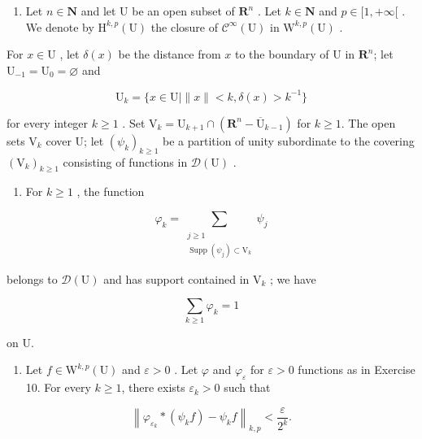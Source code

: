 \begin{enumerate}
\def\labelenumi{\arabic{enumi})}
\setcounter{enumi}{10}
\tightlist
\item
  Let \(n \in \mathbf{N}\) and let U be an open subset of \(\mathbf{R}^n\) . Let \(k \in \mathbf{N}\) and \(p \in [1, +\infty[\) . We denote by \(\mathrm{H}^{k,p}(\mathrm{U})\) the closure of \(\mathcal{C}^{\infty}(\mathrm{U})\) in \(\mathrm{W}^{k,p}(\mathrm{U})\) .
\end{enumerate}

For \(x \in \mathrm{U}\) , let \(\delta(x)\) be the distance from \(x\) to the boundary of \(\mathrm{U}\) in \(\mathbf{R}^n\); let \(\mathrm{U}_{-1} = \mathrm{U}_0 = \varnothing\) and

\[
\mathrm{U} _ {k} = \{x \in \mathrm{U} | \| x \| <   k, \delta (x) > k ^ {- 1} \}
\]

for every integer \(k \geqslant 1\) . Set \(\mathrm{V}_k = \mathrm{U}_{k+1} \cap (\mathbf{R}^n - \overline{\mathrm{U}}_{k-1})\) for \(k \geqslant 1\). The open sets \(\mathrm{V}_k\) cover U; let \((\psi_k)_{k \geqslant 1}\) be a partition of unity subordinate to the covering \((\mathrm{V}_k)_{k \geqslant 1}\) consisting of functions in \(\mathcal{D}(\mathrm{U})\) .

\begin{enumerate}
\def\labelenumi{\alph{enumi})}
\tightlist
\item
  For \(k \geqslant 1\) , the function
\end{enumerate}

\[
\varphi_{k} = \sum_{\substack{j\geqslant 1\\ \operatorname{Supp}(\psi_{j})\subset \mathrm{V}_{k}}}\psi_{j}
\]

belongs to \(\mathcal{D}(\mathrm{U})\) and has support contained in \(\mathrm{V}_k\) ; we have

\[
\sum_ {k \geqslant 1} \varphi_ {k} = 1
\]

on U.

\begin{enumerate}
\def\labelenumi{\alph{enumi})}
\setcounter{enumi}{1}
\tightlist
\item
  Let \(f \in \mathrm{W}^{k,p}(\mathrm{U})\) and \(\varepsilon > 0\) . Let \(\varphi\) and \(\varphi_{\varepsilon}\) for \(\varepsilon > 0\) functions as in Exercise 10. For every \(k \geqslant 1\), there exists \(\varepsilon_{k} > 0\) such that
\end{enumerate}

\[
\left\| \varphi_ {\varepsilon_ {k}} * (\psi_ {k} f) - \psi_ {k} f \right\| _ {k, p} <   \frac {\varepsilon}{2 ^ {k}}.
\]

